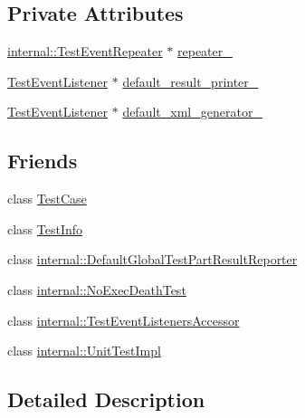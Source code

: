 \subsection*{\-Private \-Attributes}
\begin{DoxyCompactItemize}
\item 
\hyperlink{classtesting_1_1internal_1_1TestEventRepeater}{internal\-::\-Test\-Event\-Repeater} $\ast$ \hyperlink{classtesting_1_1TestEventListeners_a11b237a644ef1266c8be236cfc2a7a68}{repeater\-\_\-}
\item 
\hyperlink{classtesting_1_1TestEventListener}{\-Test\-Event\-Listener} $\ast$ \hyperlink{classtesting_1_1TestEventListeners_a4f1ccb990d3f02c155406c914b9c9c4d}{default\-\_\-result\-\_\-printer\-\_\-}
\item 
\hyperlink{classtesting_1_1TestEventListener}{\-Test\-Event\-Listener} $\ast$ \hyperlink{classtesting_1_1TestEventListeners_a7399b2441b6e88be7cb411199e3d97ac}{default\-\_\-xml\-\_\-generator\-\_\-}
\end{DoxyCompactItemize}
\subsection*{\-Friends}
\begin{DoxyCompactItemize}
\item 
class \hyperlink{classtesting_1_1TestEventListeners_a61fe0349d692eb6d4f5b94e35049b2e9}{\-Test\-Case}
\item 
class \hyperlink{classtesting_1_1TestEventListeners_aed3c96e2bd5a46339c1cbe49a4a233ee}{\-Test\-Info}
\item 
class \hyperlink{classtesting_1_1TestEventListeners_ac731f0389a3fc3cae64a80a5e53acc2a}{internal\-::\-Default\-Global\-Test\-Part\-Result\-Reporter}
\item 
class \hyperlink{classtesting_1_1TestEventListeners_a6a1fde70fe3144b5b2b8f68a131a171f}{internal\-::\-No\-Exec\-Death\-Test}
\item 
class \hyperlink{classtesting_1_1TestEventListeners_aab870c143f007b57c30389c7d5a84ea3}{internal\-::\-Test\-Event\-Listeners\-Accessor}
\item 
class \hyperlink{classtesting_1_1TestEventListeners_aa684cc13a8f91b00c0c9ce41ec7474eb}{internal\-::\-Unit\-Test\-Impl}
\end{DoxyCompactItemize}


\subsection{\-Detailed \-Description}



